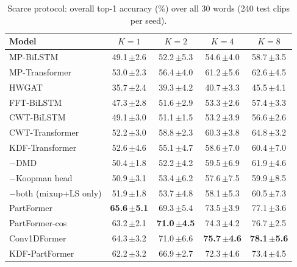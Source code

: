 \begin{table}[t]
\centering
\small
\caption{Scarce protocol: overall top-1 accuracy (\%) over all 30 words (240 test clips per seed).}
\label{tab:scarce_all}
\begin{tabular}{lcccc}
\toprule
Model & $K=1$ & $K=2$ & $K=4$ & $K=8$ \\
\midrule
MP-BiLSTM & 49.1\,{\scriptsize$\pm$2.6} & 52.2\,{\scriptsize$\pm$5.3} & 54.6\,{\scriptsize$\pm$4.0} & 58.7\,{\scriptsize$\pm$3.5} \\
MP-Transformer & 53.0\,{\scriptsize$\pm$2.3} & 56.4\,{\scriptsize$\pm$4.0} & 61.2\,{\scriptsize$\pm$5.6} & 62.6\,{\scriptsize$\pm$4.5} \\
\midrule
HWGAT & 35.7\,{\scriptsize$\pm$2.4} & 39.3\,{\scriptsize$\pm$4.2} & 40.7\,{\scriptsize$\pm$3.3} & 45.5\,{\scriptsize$\pm$4.1} \\
\midrule
FFT-BiLSTM & 47.3\,{\scriptsize$\pm$2.8} & 51.6\,{\scriptsize$\pm$2.9} & 53.3\,{\scriptsize$\pm$2.6} & 57.4\,{\scriptsize$\pm$3.3} \\
CWT-BiLSTM & 49.1\,{\scriptsize$\pm$3.0} & 51.1\,{\scriptsize$\pm$1.5} & 53.2\,{\scriptsize$\pm$3.9} & 56.6\,{\scriptsize$\pm$2.6} \\
CWT-Transformer & 52.2\,{\scriptsize$\pm$3.0} & 58.8\,{\scriptsize$\pm$2.3} & 60.3\,{\scriptsize$\pm$3.8} & 64.8\,{\scriptsize$\pm$3.2} \\
\midrule
KDF-Transformer & 52.6\,{\scriptsize$\pm$4.6} & 55.1\,{\scriptsize$\pm$4.7} & 58.6\,{\scriptsize$\pm$7.0} & 60.4\,{\scriptsize$\pm$7.0} \\
\quad $-$DMD & 50.4\,{\scriptsize$\pm$1.8} & 52.2\,{\scriptsize$\pm$4.2} & 59.5\,{\scriptsize$\pm$6.9} & 61.9\,{\scriptsize$\pm$4.6} \\
\quad $-$Koopman head & 50.9\,{\scriptsize$\pm$3.1} & 53.4\,{\scriptsize$\pm$6.2} & 57.6\,{\scriptsize$\pm$7.5} & 59.9\,{\scriptsize$\pm$8.5} \\
\quad $-$both (mixup+LS only) & 51.9\,{\scriptsize$\pm$1.8} & 53.7\,{\scriptsize$\pm$4.8} & 58.1\,{\scriptsize$\pm$5.3} & 60.5\,{\scriptsize$\pm$7.3} \\
\midrule
PartFormer & \textbf{65.6\,{\scriptsize$\pm$5.1}} & 69.3\,{\scriptsize$\pm$5.4} & 73.5\,{\scriptsize$\pm$3.9} & 77.1\,{\scriptsize$\pm$3.6} \\
PartFormer-cos & 63.2\,{\scriptsize$\pm$2.1} & \textbf{71.0\,{\scriptsize$\pm$4.5}} & 74.3\,{\scriptsize$\pm$4.2} & 76.7\,{\scriptsize$\pm$2.5} \\
Conv1DFormer & 64.3\,{\scriptsize$\pm$3.2} & 71.0\,{\scriptsize$\pm$6.6} & \textbf{75.7\,{\scriptsize$\pm$4.6}} & \textbf{78.1\,{\scriptsize$\pm$5.6}} \\
KDF-PartFormer & 62.2\,{\scriptsize$\pm$3.2} & 66.9\,{\scriptsize$\pm$2.7} & 72.3\,{\scriptsize$\pm$4.6} & 73.4\,{\scriptsize$\pm$4.5} \\
\bottomrule
\end{tabular}
\end{table}
